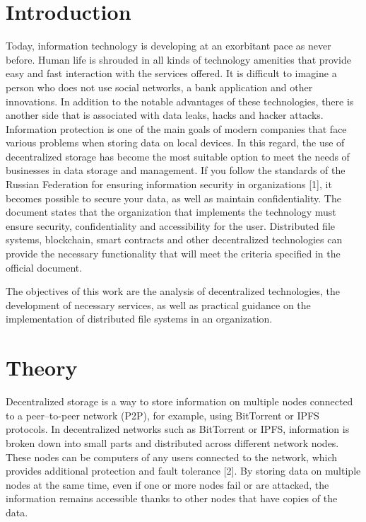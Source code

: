 \documentclass[10pt,conference,a4paper]{IEEEtran_EDM}
\begin{document}
\section{Introduction}
Today, information technology is developing at an exorbitant pace as never before. Human life is shrouded in all kinds of technology amenities that provide easy and fast interaction with the services offered. It is difficult to imagine a person who does not use social networks, a bank application and other innovations. In addition to the notable advantages of these technologies, there is another side that is associated with data leaks, hacks and hacker attacks. Information protection is one of the main goals of modern companies that face various problems when storing data on local devices. In this regard, the use of decentralized storage has become the most suitable option to meet the needs of businesses in data storage and management. If you follow the standards of the Russian Federation for ensuring information security in organizations [1], it becomes possible to secure your data, as well as maintain confidentiality. The document states that the organization that implements the technology must ensure security, confidentiality and accessibility for the user. Distributed file systems, blockchain, smart contracts and other decentralized technologies can provide the necessary functionality that will meet the criteria specified in the official document. 

The objectives of this work are the analysis of decentralized technologies, the development of necessary services, as well as practical guidance on the implementation of distributed file systems in an organization.


\section{Theory}

Decentralized storage is a way to store information on multiple nodes connected to a peer–to-peer network (P2P), for example, using BitTorrent or IPFS protocols.
In decentralized networks such as BitTorrent or IPFS, information is broken down into small parts and distributed across different network nodes. These nodes can be computers of any users connected to the network, which provides additional protection and fault tolerance [2]. By storing data on multiple nodes at the same time, even if one or more nodes fail or are attacked, the information remains accessible thanks to other nodes that have copies of the data.
\end{document}
